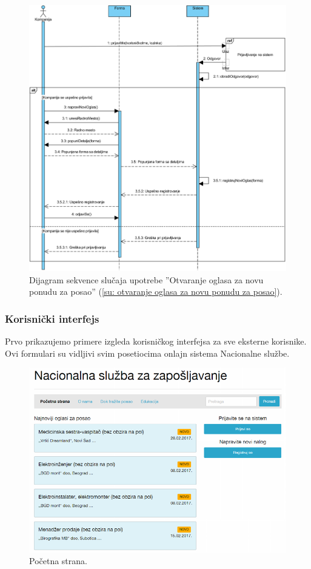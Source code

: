 \begin{figure}[H]
	\centering
	\includegraphics[width=\textwidth]{dijagrami/dijagrami-sekvence/otvaranje-oglasa-za-novu-ponudu-za-posao.png}
	\caption{Dijagram sekvence slu\v caja upotrebe ''Otvaranje oglasa za novu ponudu za posao'' (\ref{su: otvaranje oglasa za novu ponudu za posao}).}
\end{figure}

\newpage
\subsubsection{Korisni\v cki interfejs}

Prvo prikazujemo primere izgleda korisni\v ckog interfejsa za sve eksterne korisnike. Ovi formulari su vidljivi svim posetiocima onlajn sistema Nacionalne slu\v zbe.

\begin{figure}[H]
	\centering
	\includegraphics[width=\textwidth]{korisnicki-interfejs/slike/index.png}
	\caption{Po\v cetna strana.}
	\label{for: index}
\end{figure}

